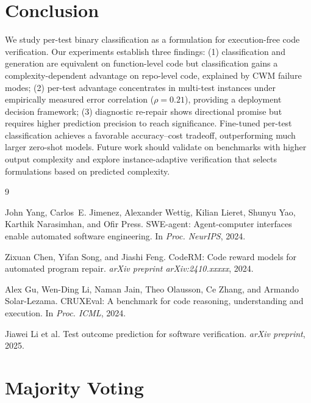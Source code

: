\documentclass[11pt,a4paper]{article}
\begin{document}
\section{Conclusion}
\label{sec:conclusion}

We study per-test binary classification as a formulation for execution-free code verification. Our experiments establish three findings: (1) classification and generation are equivalent on function-level code but classification gains a complexity-dependent advantage on repo-level code, explained by CWM failure modes; (2) per-test advantage concentrates in multi-test instances under empirically measured error correlation ($\rho{=}0.21$), providing a deployment decision framework; (3) diagnostic re-repair shows directional promise but requires higher prediction precision to reach significance. Fine-tuned per-test classification achieves a favorable accuracy--cost tradeoff, outperforming much larger zero-shot models. Future work should validate on benchmarks with higher output complexity and explore instance-adaptive verification that selects formulations based on predicted complexity.

\begin{thebibliography}{9}

John Yang, Carlos~E. Jimenez, Alexander Wettig, Kilian Lieret, Shunyu Yao, Karthik Narasimhan, and Ofir Press.
{SWE-agent}: Agent-computer interfaces enable automated software engineering.
In \emph{Proc. NeurIPS}, 2024.

Zixuan Chen, Yifan Song, and Jiashi Feng.
{CodeRM}: Code reward models for automated program repair.
\emph{arXiv preprint arXiv:2410.xxxxx}, 2024.

Alex Gu, Wen-Ding Li, Naman Jain, Theo Olausson, Ce Zhang, and Armando Solar-Lezama.
{CRUXEval}: A benchmark for code reasoning, understanding and execution.
In \emph{Proc. ICML}, 2024.

Jiawei Li et al.
Test outcome prediction for software verification.
\emph{arXiv preprint}, 2025.

\end{thebibliography}

\appendix
\section{Majority Voting}
\label{app:voting}
\end{document}

